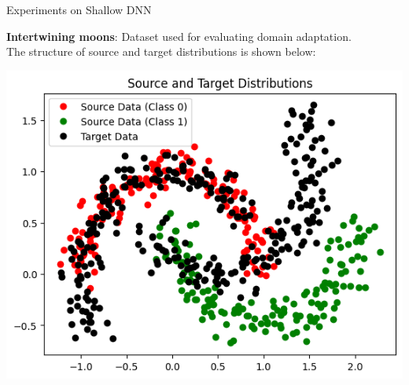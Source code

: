\documentclass{beamer}
\begin{document}
\begin{frame}{Experiments on Shallow DNN}
\vspace{-0.2cm}

\textbf{Intertwining moons}: Dataset used for evaluating domain adaptation.\\[0.2cm]
The structure of source and target distributions is shown below:

\vspace{0.5cm}

\begin{center}
    \includegraphics[width=0.7\linewidth]{moon.png}
\end{center}

\end{frame}


\end{document}
